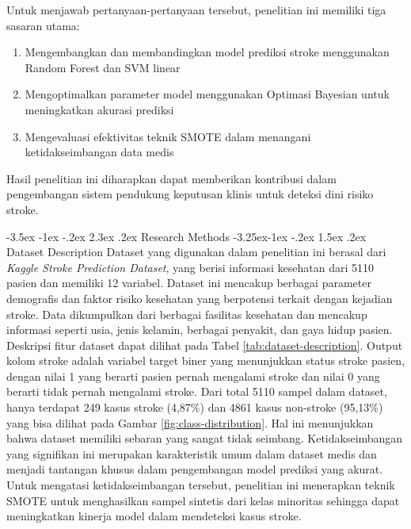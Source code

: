 \documentclass[10pt]{article}
\makeatletter
\renewcommand\section{\@startsection{section}{1}{\z@}%
  {-3.5ex \@plus -1ex \@minus -.2ex}%
  {2.3ex \@plus.2ex}%
  {\normalfont\normalsize\bfseries}}
\renewcommand\subsection{\@startsection{subsection}{2}{\z@}%
  {-3.25ex\@plus -1ex \@minus -.2ex}%
  {1.5ex \@plus .2ex}%
  {\normalfont\itshape\normalsize}}
\makeatother
\begin{document}
\begin{multicols}{2}
    Untuk menjawab pertanyaan-pertanyaan tersebut, penelitian ini memiliki tiga
    sasaran utama:
    \begin{enumerate}
        \item Mengembangkan dan membandingkan model prediksi stroke menggunakan Random Forest
              dan SVM linear
        \item Mengoptimalkan parameter model menggunakan Optimasi Bayesian untuk meningkatkan
              akurasi prediksi
        \item Mengevaluasi efektivitas teknik SMOTE dalam menangani ketidakseimbangan data
              medis
    \end{enumerate}

    Hasil penelitian ini diharapkan dapat memberikan kontribusi dalam pengembangan
    sistem pendukung keputusan klinis untuk deteksi dini risiko stroke.

    \section{Research Methods}
    \subsection{Dataset Description}
    Dataset yang digunakan dalam penelitian ini berasal dari \textit{Kaggle Stroke
        Prediction Dataset}\cite{kaggleStrokePredictionDataset}, yang berisi informasi
    kesehatan dari 5110 pasien dan memiliki 12 variabel. Dataset ini mencakup
    berbagai parameter demografis dan faktor risiko kesehatan yang berpotensi
    terkait dengan kejadian stroke. Data dikumpulkan dari berbagai fasilitas
    kesehatan dan mencakup informasi seperti usia, jenis kelamin, berbagai
    penyakit, dan gaya hidup pasien. Deskripsi fitur dataset dapat dilihat pada
    Tabel \ref{tab:dataset-description}. Output kolom stroke adalah variabel target
    biner yang menunjukkan status stroke pasien, dengan nilai 1 yang berarti pasien
    pernah mengalami stroke dan nilai 0 yang berarti tidak pernah mengalami stroke.
    Dari total 5110 sampel dalam dataset, hanya terdapat 249 kasus stroke (4,87\%)
    dan 4861 kasus non-stroke (95,13\%) yang bisa dilihat pada Gambar
    \ref{fig:class-distribution}. Hal ini menunjukkan bahwa dataset memiliki
    sebaran yang sangat tidak seimbang. Ketidakseimbangan yang signifikan ini
    merupakan karakteristik umum dalam dataset medis dan menjadi tantangan khusus
    dalam pengembangan model prediksi yang akurat. Untuk mengatasi
    ketidakseimbangan tersebut, penelitian ini menerapkan teknik SMOTE untuk
    menghasilkan sampel sintetis dari kelas minoritas sehingga dapat meningkatkan
    kinerja model dalam mendeteksi kasus stroke.


\end{multicols}
\end{document}
